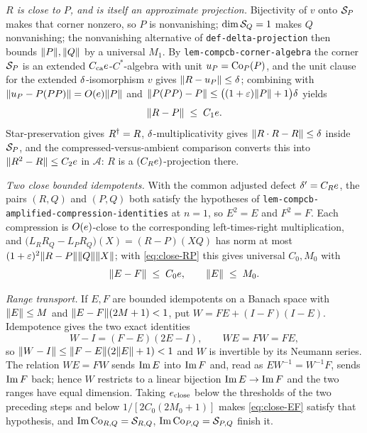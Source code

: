\emph{$R$ is close to $P$, and is itself an approximate projection.} Bijectivity of $v$
onto $\mathcal S_{P}$ makes that corner nonzero, so $P$ is nonvanishing; $\dim\mathcal S_{Q}=1$ makes
$Q$ nonvanishing; the nonvanishing alternative of \texttt{def-delta-projection} then
bounds $\lVert P\rVert,\lVert Q\rVert$ by a universal $M_1$. By
\texttt{lem-compcb-corner-algebra} the corner $\mathcal S_{P}$ is an extended
$C_{\mathrm{ca}}e$-$C^*$-algebra with unit $u_{P}=\mathrm{Co}_{P}(P)$, and the unit clause
for the extended $\delta$-isomorphism $v$ gives $\lVert R-u_{P}\rVert\le\delta$; combining
with $\lVert u_{P}-P(PP)\rVert=O(e)\lVert P\rVert$ and
$\lVert P(PP)-P\rVert\le\bigl((1+\varepsilon)\lVert P\rVert+1\bigr)\delta$ yields
\begin{equation}\label{eq:close-RP}
  \lVert R-P\rVert\;\le\;C_1e .
\end{equation}
Star-preservation gives $R^{\dagger}=R$, $\delta$-multiplicativity gives $\lVert R\mathbin{\cdot} R-R\rVert\le\delta$
inside $\mathcal S_{P}$, and the compressed-versus-ambient comparison converts this into
$\lVert R^{2}-R\rVert\le C_2e$ in $\mathcal A$: $R$ is a $(C_Re)$-projection there.

\emph{Two close bounded idempotents.} With the common adjusted defect
$\delta'=C_Re$, the pairs $(R,Q)$ and $(P,Q)$ both satisfy the hypotheses of
\texttt{lem-compcb-amplified-compression-identities} at $n=1$, so $E^{2}=E$ and
$F^{2}=F$. Each compression is $O(e)$-close to the corresponding
left-times-right multiplication, and
$\bigl(L_RR_Q-L_PR_Q\bigr)(X)=(R-P)(XQ)$ has norm at most
$(1+\varepsilon)^{2}\lVert R-P\rVert\lVert Q\rVert\lVert X\rVert$; with \eqref{eq:close-RP} this gives universal
$C_0,M_0$ with
\begin{equation}\label{eq:close-EF}
  \lVert E-F\rVert\;\le\;C_0e,\qquad \lVert E\rVert\;\le\;M_0 .
\end{equation}

\emph{Range transport.} If $E,F$ are bounded idempotents on a Banach space with
$\lVert E\rVert\le M$ and $\lVert E-F\rVert(2M+1)<1$, put $W=FE+(I-F)(I-E)$. Idempotence gives the two
exact identities
\begin{equation}\label{eq:close-W}
  W-I=(F-E)(2E-I),\qquad WE=FW=FE ,
\end{equation}
so $\lVert W-I\rVert\le\lVert F-E\rVert(2\lVert E\rVert+1)<1$ and $W$ is invertible by its Neumann series.
The relation $WE=FW$ sends $\operatorname{Im} E$ into $\operatorname{Im} F$ and, read as $EW^{-1}=W^{-1}F$,
sends $\operatorname{Im} F$ back; hence $W$ restricts to a linear bijection $\operatorname{Im} E\to\operatorname{Im} F$ and the
two ranges have equal dimension. Taking
$e_{\mathrm{close}}$ below the thresholds of the two preceding steps and below
$1/[2C_0(2M_0+1)]$ makes \eqref{eq:close-EF} satisfy that hypothesis, and
$\operatorname{Im}\mathrm{Co}_{R,Q}=\mathcal S_{R,Q}$, $\operatorname{Im}\mathrm{Co}_{P,Q}=\mathcal S_{P,Q}$ finish it.

